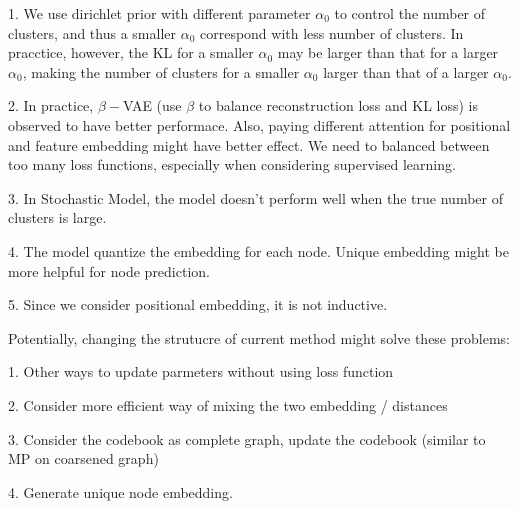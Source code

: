 \documentclass[12pt]{amsart}
\begin{document}
1. We use dirichlet prior with different parameter $\alpha_0$ to control the number of clusters, and thus a smaller $\alpha_0$ correspond with less number of clusters. 
In pracctice, however, the KL for a smaller $\alpha_0$ may be larger than that for a larger $\alpha_0$, making the number of clusters for a smaller $\alpha_0$ larger than that of a larger $\alpha_0$.

2. In practice, $\beta-$VAE (use $\beta$ to balance reconstruction loss and KL loss) is observed to have better performace. 
Also, paying different attention for positional and feature embedding might have better effect. We need to balanced between too many loss functions, especially when considering supervised learning.

3. In Stochastic Model, the model doesn't perform well when the true number of clusters is large. 

4. The model quantize the embedding for each node. Unique embedding might be more helpful for node prediction.

5. Since we consider positional embedding, it is not inductive.

Potentially, changing the strutucre of current method might solve these problems:

1. Other ways to update parmeters without using loss function 

2. Consider more efficient way of mixing the two embedding / distances

3. Consider the codebook as complete graph, update the codebook (similar to MP on coarsened graph)

4. Generate unique node embedding.
\end{document}

